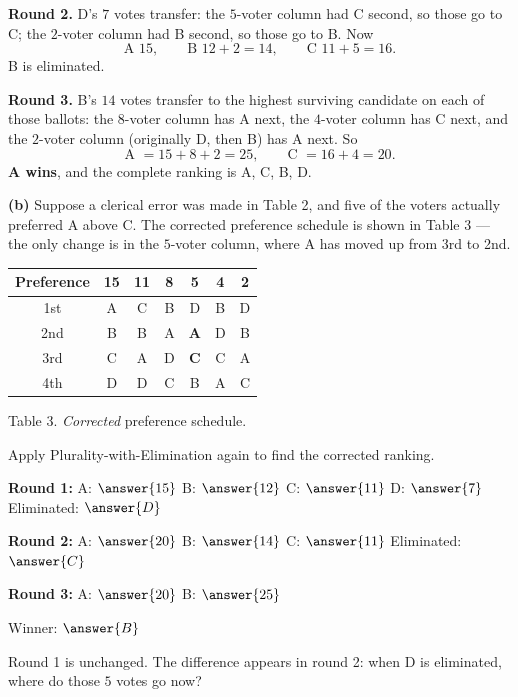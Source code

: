 \documentclass[12pt]{ximera}
\begin{document}
\begin{problem}
\begin{prompt}
\begin{feedback}
\textbf{Round 2.} D's $7$ votes transfer: the $5$-voter column had C second, so those
go to C; the $2$-voter column had B second, so those go to B. Now
\[ \text{A } 15, \qquad \text{B } 12+2 = 14, \qquad \text{C } 11+5 = 16. \]
B is eliminated.

\textbf{Round 3.} B's $14$ votes transfer to the highest surviving candidate on each
of those ballots: the $8$-voter column has A next, the $4$-voter column has C next,
and the $2$-voter column (originally D, then B) has A next. So
\[ \text{A } = 15+8+2 = 25, \qquad \text{C } = 16+4 = 20. \]
\textbf{A wins}, and the complete ranking is A, C, B, D.
\end{feedback}
\end{prompt}

\begin{prompt}
\textbf{(b)} Suppose a clerical error was made in Table 2, and five of the voters
actually preferred A above C. The corrected preference schedule is shown in Table 3
--- the only change is in the $5$-voter column, where A has moved up from 3rd to 2nd.

\begin{center}
\begin{tabular}{c|cccccc}
Preference & 15 & 11 & 8 & \textbf{5} & 4 & 2 \\\hline
1st & A & C & B & D & B & D \\
2nd & B & B & A & \textbf{A} & D & B \\
3rd & C & A & D & \textbf{C} & C & A \\
4th & D & D & C & B & A & C
\end{tabular}

\smallskip
Table 3. \emph{Corrected} preference schedule.
\end{center}

Apply Plurality-with-Elimination again to find the corrected ranking.

\textbf{Round 1:} A: $\answer{15}$ \quad B: $\answer{12}$ \quad C: $\answer{11}$ \quad
D: $\answer{7}$ \qquad Eliminated: $\answer{D}$

\smallskip
\textbf{Round 2:} A: $\answer{20}$ \quad B: $\answer{14}$ \quad C: $\answer{11}$
\qquad Eliminated: $\answer{C}$

\smallskip
\textbf{Round 3:} A: $\answer{20}$ \quad B: $\answer{25}$

\smallskip
Winner: $\answer{B}$

\begin{hint}
Round 1 is unchanged. The difference appears in round 2: when D is eliminated, where
do those $5$ votes go now?
\end{hint}


\end{prompt}
\end{problem}
\end{document}
